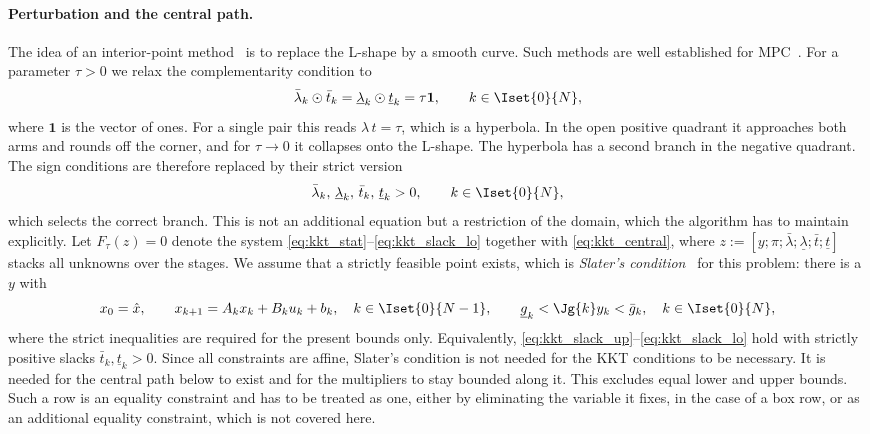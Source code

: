 \paragraph{Perturbation and the central path.}
The idea of an interior-point method~\cite{wright1997primal,nocedal2006numerical} is to replace the L-shape by a smooth curve.
Such methods are well established for MPC~\cite{rao1998application,domahidi2012efficient,frison2020hpipm}.
For a parameter $\tau > 0$ we relax the complementarity condition to
\begin{equation} \label{eq:kkt_central}
    \bar{\lambda}_k \odot \bar{t}_k = \underline{\lambda}_k \odot \underline{t}_k = \tau \mathbf{1}, \qquad k\in\Iset{0}{N},
\end{equation}
where $\mathbf{1}$ is the vector of ones.
For a single pair this reads $\lambda\, t = \tau$, which is a hyperbola.
In the open positive quadrant it approaches both arms and rounds off the corner, and for $\tau \to 0$ it collapses onto the L-shape.
The hyperbola has a second branch in the negative quadrant.
The sign conditions are therefore replaced by their strict version
\begin{equation} \label{eq:sign_strict}
    \bar{\lambda}_k,\, \underline{\lambda}_k,\, \bar{t}_k,\, \underline{t}_k > 0, \qquad k\in\Iset{0}{N},
\end{equation}
which selects the correct branch.
This is not an additional equation but a restriction of the domain, which the algorithm has to maintain explicitly.
Let $F_\tau(z) = 0$ denote the system \eqref{eq:kkt_stat}--\eqref{eq:kkt_slack_lo} together with \eqref{eq:kkt_central}, where $z := [y; \pi; \bar{\lambda}; \underline{\lambda}; \bar{t}; \underline{t}]$ stacks all unknowns over the stages.
We assume that a strictly feasible point exists, which is \textit{Slater's condition}~\cite{boyd2004convex} for this problem:
there is a $y$ with
\[
    x_0 = \hat{x}, \qquad
    x_{k+1} = A_k x_k + B_k u_k + b_k , \quad k\in\Iset{0}{N-1}, \qquad
    \underline{g}_k < \Jg{k} y_k < \bar{g}_k , \quad k\in\Iset{0}{N},
\]
where the strict inequalities are required for the present bounds only.
Equivalently, \eqref{eq:kkt_slack_up}--\eqref{eq:kkt_slack_lo} hold with strictly positive slacks $\bar{t}_k, \underline{t}_k > 0$.
Since all constraints are affine, Slater's condition is not needed for the KKT conditions to be necessary.
It is needed for the central path below to exist and for the multipliers to stay bounded along it.
This excludes equal lower and upper bounds.
Such a row is an equality constraint and has to be treated as one, either by eliminating the variable it fixes, in the case of a box row, or as an additional equality constraint, which is not covered here.

